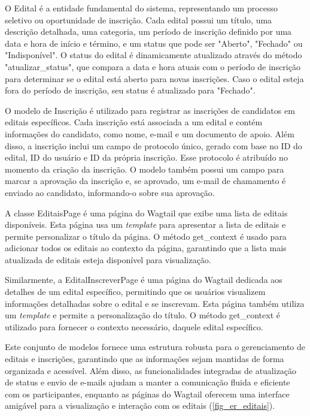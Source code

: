 O Edital é a entidade fundamental do sistema, representando um processo seletivo ou oportunidade de inscrição. Cada edital possui um título, uma descrição detalhada, uma categoria, um período de inscrição definido por uma data e hora de início e término, e um status que pode ser "Aberto", "Fechado" ou "Indisponível". O status do edital é dinamicamente atualizado através do método "atualizar\_status", que compara a data e hora atuais com o período de inscrição para determinar se o edital está aberto para novas inscrições. Caso o edital esteja fora do período de inscrição, seu status é atualizado para "Fechado".

O modelo de Inscrição é utilizado para registrar as inscrições de candidatos em editais específicos. Cada inscrição está associada a um edital e contém informações do candidato, como nome, e-mail e um documento de apoio. Além disso, a inscrição inclui um campo de protocolo único, gerado com base no ID do edital, ID do usuário e ID da própria inscrição. Esse protocolo é atribuído no momento da criação da inscrição. O modelo também possui um campo para marcar a aprovação da inscrição e, se aprovado, um e-mail de chamamento é enviado ao candidato, informando-o sobre sua aprovação.

A classe EditaisPage é uma página do Wagtail que exibe uma lista de editais disponíveis. Esta página usa um \textit{template} para apresentar a lista de editais e permite personalizar o título da página. O método get\_context é usado para adicionar todos os editais ao contexto da página, garantindo que a lista mais atualizada de editais esteja disponível para visualização.

Similarmente, a EditalInscreverPage é uma página do Wagtail dedicada aos detalhes de um edital específico, permitindo que os usuários visualizem informações detalhadas sobre o edital e se inscrevam. Esta página também utiliza um \textit{template} e permite a personalização do título. O método get\_context é utilizado para fornecer o contexto necessário, daquele edital específico.

Este conjunto de modelos fornece uma estrutura robusta para o gerenciamento de editais e inscrições, garantindo que as informações sejam mantidas de forma organizada e acessível. Além disso, as funcionalidades integradas de atualização de status e envio de e-mails ajudam a manter a comunicação fluida e eficiente com os participantes, enquanto as páginas do Wagtail oferecem uma interface amigável para a visualização e interação com os editais (\autoref{fig_er_editais}).

